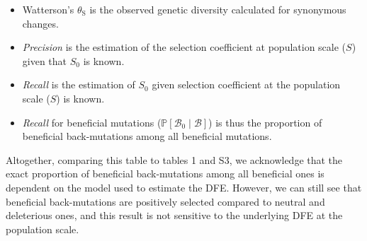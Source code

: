 \documentclass{article}
\newcommand{\proba}{\mathbb{P}}
\newcommand{\Sphy}{S_{0}}
\newcommand{\SphyBen}{\mathcal{B}_0}
\newcommand{\given}{\mid}
\newcommand{\Spop}{S}
\newcommand{\SpopBen}{\mathcal{B}}
\newcommand{\thetaSyn}{\theta_{\text{S}}}
\begin{document}
    \begin{itemize}
        \item Watterson's $\thetaSyn$ is the observed genetic diversity calculated for synonymous changes.
        \item \textit{Precision} is the estimation of the selection coefficient at population scale ($\Spop$) given that $\Sphy$ is known.
        \item \textit{Recall} is the estimation of $\Sphy$ given selection coefficient at the population scale ($\Spop$) is known.
        \item \textit{Recall} for beneficial mutations ($\proba [\SphyBen \given \SpopBen]$) is thus the proportion of beneficial back-mutations among all beneficial mutations.
    \end{itemize}

    Altogether, comparing this table to tables 1 and S3, we acknowledge that the exact proportion of beneficial back-mutations among all beneficial ones is dependent on the model used to estimate the DFE.
    However, we can still see that beneficial back-mutations are positively selected compared to neutral and deleterious ones, and this result is not sensitive to the underlying DFE at the population scale.


\end{document}
